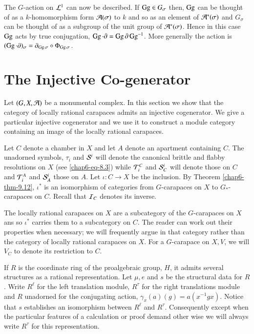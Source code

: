 The $G$-action on $\mathcal{L}^{1}$ can now be described. If $\operatorname{Gg} \in G_{\sigma}$ then, $\operatorname{Gg}$ can be thought of as a $k$-homomorphism form $\mathcal{A}(\sigma)$ to $k$ and so as an element of $\mathcal{A}^{*}(\sigma)$ and $G_{\sigma}$ can be thought of as a subgroup of the unit group of $\mathcal{A}^{*}(\sigma)$. Hence in this case $\operatorname{Gg}$ acts by true conjugation, $\operatorname{Gg} \cdot \partial = \operatorname{Gg} \partial\operatorname{Gg}^{-1}$. More generally the action is $(\operatorname{Gg} \cdot \partial)_{\sigma} = \partial_{\operatorname{Gg} \sigma} \circ \Phi_{\operatorname{Gg} \sigma}$.

\section{The Injective Co-generator}\label{chap6-sec-14}
\pageoriginale

Let $(G, X, \mathcal{A})$ be a monumental complex. In this section we show that the category of locally rational carapaces admits an injective cogenerator. We give a particular injective cogenerator and we use it to construct a module category containing an image of the locally rational carapaces.

Let $C$ denote a chamber in $X$ and let $A$ denote an apartment containing $C$. The unadorned symbols, $\tau_{i}$ and $\mathcal{S}^{i}$ will denote the canonical brittle and flabby resolutions on $X$ (see \ref{chap6-eq-8.3}) while $\mathcal{T}_{i}^{C}$ and $\mathcal{S}_{C}^{i}$ will denote those on $C$ and $\mathcal{T}_{i}^{A}$ and $\mathcal{S}_{A}^{i}$ those on $A$.
 Let $\iota : C \rightarrow X$ be the inclusion. By Theorem \ref{chap6-thm-9.12}, $\iota^{*}$ is an isomorphism of categories from $G$-carapaces on $X$ to $G_{*}$-carapaces on $C$. Recall that $\mathcal{I}_{C}$ denotes its inverse. 

The locally rational carapaces on $X$ are a subcategory of the $G$-carapaces on $X$ ans so $\iota^{*}$ carries them to a subcategory on $C$. The reader can work out their properties when necessary; we will frequently argue in that category rather than the category of locally rational carapaces on $X$. For a $G$-carapace on $X, V$, we will $V_{C}$ to denote its restriction to $C$.

If $R$ is the coordinate ring of the proalgebraic group, $H$, it admits several structures as a rational representation.
Let $\mu, e$ and $s$ be the structural data for $R$. Write $R^{\ell}$ for the left translation module, $R^{\tau}$ for the right  translations module and $R$ unadorned for the conjugating action, $\gamma_{x}(a)(g) = a(x^{-1} gx)$. Notice that $s$ establishes an isomorphism between $R^{\ell}$ and $R^{\tau}$. Consequently except when the particular features of a calculation or proof demand other wise we will always write $R^{\tau}$ for this representation.

